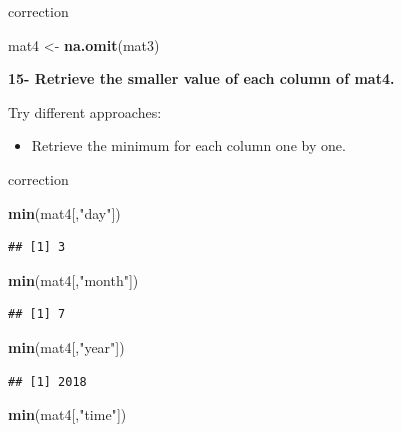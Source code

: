 \documentclass[]{book}
\newenvironment{Shaded}{\begin{snugshade}}{\end{snugshade}}
\newcommand{\KeywordTok}[1]{\textcolor[rgb]{0.13,0.29,0.53}{\textbf{#1}}}
\newcommand{\NormalTok}[1]{#1}
\newcommand{\StringTok}[1]{\textcolor[rgb]{0.31,0.60,0.02}{#1}}
\providecommand{\tightlist}{%
  \setlength{\itemsep}{0pt}\setlength{\parskip}{0pt}}
\begin{document}
correction

\begin{Shaded}
\begin{Highlighting}[]
\NormalTok{mat4 <-}\StringTok{ }\KeywordTok{na.omit}\NormalTok{(mat3)}
\end{Highlighting}
\end{Shaded}

\textbf{15- Retrieve the smaller value of each column of mat4.}

Try different approaches:

\begin{itemize}
\tightlist
\item
  Retrieve the minimum for each column one by one.
\end{itemize}

correction

\begin{Shaded}
\begin{Highlighting}[]
\KeywordTok{min}\NormalTok{(mat4[,}\StringTok{"day"}\NormalTok{])}
\end{Highlighting}
\end{Shaded}

\begin{verbatim}
## [1] 3
\end{verbatim}

\begin{Shaded}
\begin{Highlighting}[]
\KeywordTok{min}\NormalTok{(mat4[,}\StringTok{"month"}\NormalTok{])}
\end{Highlighting}
\end{Shaded}

\begin{verbatim}
## [1] 7
\end{verbatim}

\begin{Shaded}
\begin{Highlighting}[]
\KeywordTok{min}\NormalTok{(mat4[,}\StringTok{"year"}\NormalTok{])}
\end{Highlighting}
\end{Shaded}

\begin{verbatim}
## [1] 2018
\end{verbatim}

\begin{Shaded}
\begin{Highlighting}[]
\KeywordTok{min}\NormalTok{(mat4[,}\StringTok{"time"}\NormalTok{])}
\end{Highlighting}
\end{Shaded}
\end{document}
